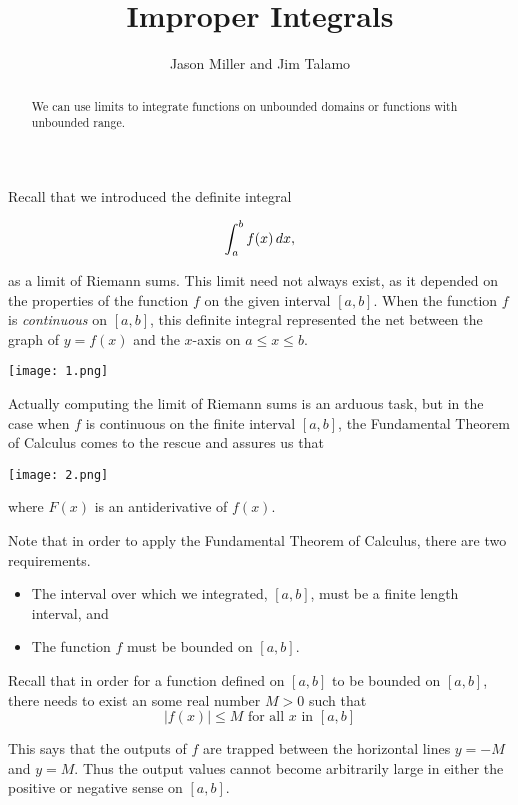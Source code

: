 \documentclass{ximera}
\author{Jason Miller and Jim Talamo}
\title[Dig-In:]{Improper Integrals}
\begin{document}
\begin{abstract}
  We can use limits to integrate functions on unbounded domains or functions with unbounded range.
\end{abstract}
\maketitle


Recall that we introduced the definite integral

\[
\int_a^b f(x) \mathop{}\!d x,
\]

as a limit of Riemann sums.  This limit need not always exist, as it depended on the properties of the
function $f$ on the given interval $[a, b]$.  When the function $f$ is \emph{continuous} on $[a,b]$, this 
definite integral represented the net between the graph of $y=f(x)$ and the $x$-axis on $a \leq x \leq b$. 

\begin{image}
   \texttt{[image: 1.png]}
\end{image}


Actually computing the limit of Riemann sums is an arduous task, but in the case when $f$ is continuous on the finite interval $[a,b]$, the Fundamental Theorem of Calculus comes to the rescue and assures us that 

\begin{image}
   \texttt{[image: 2.png]}
\end{image}

where $F(x)$ is an antiderivative of $f(x)$.

Note that in order to apply the Fundamental Theorem of Calculus, there are two requirements.

\begin{itemize}
\item The interval over which we integrated, $[a,b]$, must be a finite length
  interval, and
\item The function $f$ must be bounded on $[a,b]$.
\end{itemize}


\begin{remark}
Recall that in order for a function defined on $[a, b]$ to be bounded on $[a,b]$, there needs to exist an some real number $M>0$ such that 
\[
|f(x)| \leq M \text{ for all } x \text{ in } [a, b]
\]

This says that the outputs of $f$ are trapped between the horizontal lines $y=-M$ and $y=M$. Thus the output values cannot 
become arbitrarily large in either the positive or negative sense on $[a,b]$. 
\end{remark}
\end{document}
